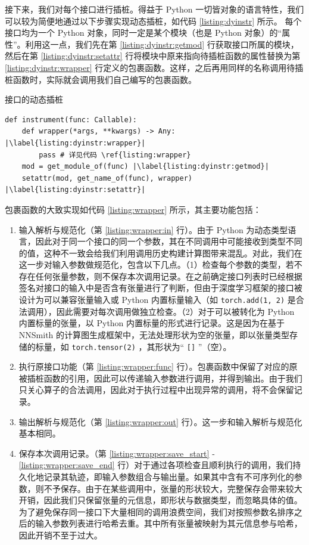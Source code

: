 接下来，我们对每个接口进行插桩。得益于 Python 一切皆对象的语言特性，我们可以较为简便地通过以下步骤实现动态插桩，如代码 \ref{listing:dyinstr} 所示。
每个接口均为一个 Python 对象，同时一定是某个模块（也是 Python 对象）的“属性”。利用这一点，我们先在第 \ref{listing:dyinstr:getmod} 行获取接口所属的模块，然后在第 \ref{listing:dyinstr:setattr} 行将模块中原来指向待插桩函数的属性替换为第 \ref{listing:dyinstr:wrapper} 行定义的包裹函数。这样，之后再用同样的名称调用待插桩函数时，实际就会调用我们自己编写的包裹函数。

\begin{listing}[]
    \caption{接口的动态插桩}
    \label{listing:dyinstr}
\begin{verbatim}
def instrument(func: Callable):
    def wrapper(*args, **kwargs) -> Any: |\label{listing:dyinstr:wrapper}|
        pass # 详见代码 \ref{listing:wrapper}
    mod = get_module_of(func) |\label{listing:dyinstr:getmod}|
    setattr(mod, get_name_of(func), wrapper) |\label{listing:dyinstr:setattr}|
\end{verbatim}
\end{listing}

包裹函数的大致实现如代码 \ref{listing:wrapper} 所示，其主要功能包括：

\begin{enumerate}
    \item 输入解析与规范化（第 \ref{listing:wrapper:in} 行）。由于 Python 为动态类型语言，因此对于同一个接口的同一个参数，其在不同调用中可能接收到类型不同的值，这种不一致会给我们利用调用历史构建计算图带来混乱。对此，我们在这一步对输入参数做规范化，包含以下几点。（1）检查每个参数的类型，若不存在任何张量参数，则不保存本次调用记录。在之前确定接口列表时已经根据签名对接口的输入中是否含有张量进行了判断，但由于深度学习框架的接口被设计为可以兼容张量输入或 Python 内置标量输入（如 \texttt{torch.add(1, 2)} 是合法调用），因此需要对每次调用做独立检查。（2）对于可以被转化为 Python 内置标量的张量，以 Python 内置标量的形式进行记录。这是因为在基于 NNSmith 的计算图生成框架中，无法处理形状为空的张量，即以张量类型存储的标量，如 \texttt{torch.tensor(2)} ，其形状为“ \texttt{[]} ”（空）。
    \item 执行原接口功能（第 \ref{listing:wrapper:func} 行）。包裹函数中保留了对应的原被插桩函数的引用，因此可以传递输入参数进行调用，并得到输出。由于我们只关心算子的合法调用，因此对于执行过程中出现异常的调用，将不会保留记录。
    \item 输出解析与规范化（第 \ref{listing:wrapper:out} 行）。这一步和输入解析与规范化基本相同。
    \item 保存本次调用记录。（第 \ref{listing:wrapper:save_start} - \ref{listing:wrapper:save_end} 行）对于通过各项检查且顺利执行的调用，我们持久化地记录其轨迹，即输入参数组合与输出量。如果其中含有不可序列化的参数，则不予保存。由于在某些调用中，张量的形状较大，完整保存会带来较大开销，因此我们只保留张量的元信息，即形状与数据类型，而忽略具体的值。为了避免保存同一接口下大量相同的调用浪费空间，我们对按照参数名排序之后的输入参数列表进行哈希去重。其中所有张量被映射为其元信息参与哈希，因此开销不至于过大。
\end{enumerate}

